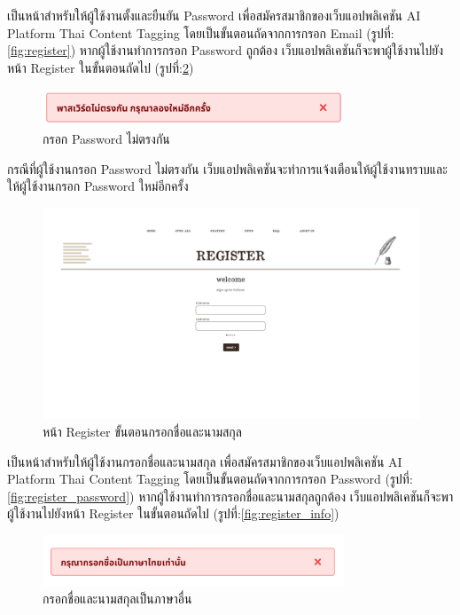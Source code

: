 \documentclass[12pt,oneside,openright,a4paper]{cpe-thai-project}
\begin{document}
\hspace*{1cm}เป็นหน้าสำหรับให้ผู้ใช้งานตั้งและยืนยัน Password เพื่อสมัครสมาชิกของเว็บแอปพลิเคชัน AI Platform Thai Content Tagging 
โดยเป็นขั้นตอนถัดจากการกรอก Email (รูปที่:\ref{fig:register}) หากผู้ใช้งานทำการกรอก Password ถูกต้อง เว็บแอปพลิเคชันก็จะพาผู้ใช้งานไปยังหน้า Register ในขั้นตอนถัดไป (รูปที่:\ref{fig:register_name})
\begin{figure}[!ht]\centering
  \includegraphics[width=9cm]{./img/project_ui/password.png} 
  \caption{กรอก Password ไม่ตรงกัน}\label{fig:password} 
\end{figure}
\newline\hspace*{1cm}กรณีที่ผู้ใช้งานกรอก Password ไม่ตรงกัน เว็บแอปพลิเคชันจะทำการแจ้งเตือนให้ผู้ใช้งานทราบและให้ผู้ใช้งานกรอก Password ใหม่อีกครั้ง
\begin{figure}[!ht]\centering
  \includegraphics[width=14cm]{./img/project_ui/6.png} 
  \caption{หน้า Register ขั้นตอนกรอกชื่อและนามสกุล}\label{fig:register_name} 
\end{figure} \newpage
\hspace*{1cm}เป็นหน้าสำหรับให้ผู้ใช้งานกรอกชื่อและนามสกุล เพื่อสมัครสมาชิกของเว็บแอปพลิเคชัน AI Platform Thai Content Tagging 
โดยเป็นขั้นตอนถัดจากการกรอก Password (รูปที่:\ref{fig:register_password}) หากผู้ใช้งานทำการกรอกชื่อและนามสกุลถูกต้อง เว็บแอปพลิเคชันก็จะพาผู้ใช้งานไปยังหน้า Register ในขั้นตอนถัดไป (รูปที่:\ref{fig:register_info})
\begin{figure}[!ht]\centering
  \includegraphics[width=9cm]{./img/project_ui/thaionly.png} 
  \caption{กรอกชื่อและนามสกุลเป็นภาษาอื่น}\label{fig:worngname} 
\end{figure}
\end{document}
